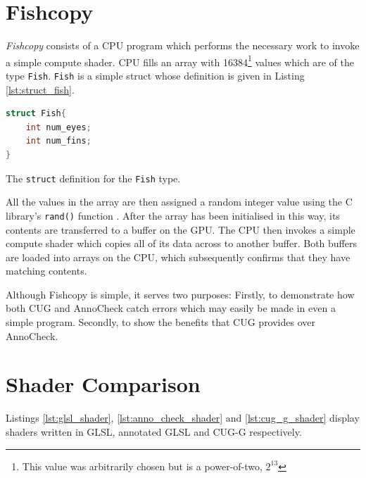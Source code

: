 \documentclass[a4paper,12pt,twoside,openright]{report}
\begin{document}
\section{Fishcopy}

\textit{Fishcopy} consists of a CPU program which performs the necessary work
to invoke a simple compute shader. CPU fills an array with 16384\footnote{This
value was arbitrarily chosen but is a power-of-two, $2^{13}$} values which are
of the type \texttt{Fish}. \texttt{Fish} is a simple struct whose definition is
given in Listing \ref{lst:struct_fish}.

\begin{lstfloat}
\begin{lstlisting}[language=C]
struct Fish{
    int num_eyes;
    int num_fins;
}
\end{lstlisting}
\caption{The \texttt{struct} definition for the \texttt{Fish} type.}
\label{lst:struct_fish}
\end{lstfloat}

% 

All the values in the array are then assigned a random integer value using the
C library's \texttt{rand()} function \cite{RandRef}. After the array has been
initialised in this way, its contents are transferred to a buffer on the GPU.
The CPU then invokes a simple compute shader which copies all of its data
across to another buffer. Both buffers are loaded into arrays on the CPU, which
subsequently confirms that they have matching contents.

Although Fishcopy is simple, it serves two purposes: Firstly, to demonstrate
how both CUG and AnnoCheck catch errors which may easily be made in even a
simple program. Secondly, to show the benefits that CUG provides over
AnnoCheck.

\section{Shader Comparison}

\label{sec:shader_comparison}

Listings \ref{lst:glsl_shader}, \ref{lst:anno_check_shader} and
\ref{lst:cug_g_shader} display shaders written in GLSL, annotated GLSL and
CUG-G respectively.
\end{document}
